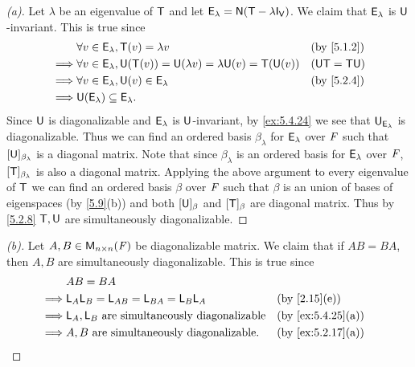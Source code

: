 \begin{proof}[(a)]
  Let \(\lambda\) be an eigenvalue of \(\mathsf{T}\) and let \(\vs{E}_{\lambda} = \ns{\T - \lambda \IT[\V]}\).
  We claim that \(\mathsf{E}_{\lambda}\) is \(\mathsf{U}\)-invariant.
  This is true since
  \begin{align*}
             & \forall v \in \vs{E}_{\lambda}, \T(v) = \lambda v                                     &  & \by{5.1.2}      \\
    \implies & \forall v \in \vs{E}_{\lambda}, \U(\T(v)) = \U(\lambda v) = \lambda \U(v) = \T(\U(v)) &  & (\U \T = \T \U) \\
    \implies & \forall v \in \vs{E}_{\lambda}, \U(v) \in \vs{E}_{\lambda}                            &  & \by{5.2.4}      \\
    \implies & \U(\vs{E}_{\lambda}) \subseteq \vs{E}_{\lambda}.
  \end{align*}
  Since \(\mathsf{U}\) is diagonalizable and \(\mathsf{E}_{\lambda}\) is \(\mathsf{U}\)-invariant, by \cref{ex:5.4.24} we see that \(\mathsf{U}_{\mathsf{E}_{\lambda}}\) is diagonalizable.
  Thus we can find an ordered basis \(\beta_{\lambda}\) for \(\mathsf{E}_{\lambda}\) over \(\mathit{F}\) such that \([\mathsf{U}]_{\beta_{\lambda}}\) is a diagonal matrix.
  Note that since \(\beta_{\lambda}\) is an ordered basis for \(\mathsf{E}_{\lambda}\) over \(\mathit{F}\), \([\mathsf{T}]_{\beta_{\lambda}}\) is also a diagonal matrix.
  Applying the above argument to every eigenvalue of \(\mathsf{T}\) we can find an ordered basis \(\beta\) over \(\mathit{F}\) such that \(\beta\) is an union of bases of eigenspaces (by \cref{5.9}(b)) and both \([\mathsf{U}]_{\beta}\) and \([\mathsf{T}]_{\beta}\) are diagonal matrix.
  Thus by \cref{5.2.8} \(\mathsf{T}, \mathsf{U}\) are simultaneously diagonalizable.
\end{proof}

\begin{proof}[(b)]
  Let \(A, B \in \ms[n][n][\F]\) be diagonalizable matrix.
  We claim that if \(AB = BA\), then \(A, B\) are simultaneously diagonalizable.
  This is true since
  \begin{align*}
             & AB = BA                                                                     \\
    \implies & \L_A \L_B = \L_{AB} = \L_{BA} = \L_B \L_A            &  & \by{2.15}[e]      \\
    \implies & \L_A, \L_B \text{ are simultaneously diagonalizable} &  & \by{ex:5.4.25}[a] \\
    \implies & A, B \text{ are simultaneously diagonalizable}.      &  & \by{ex:5.2.17}[a]
  \end{align*}
\end{proof}

